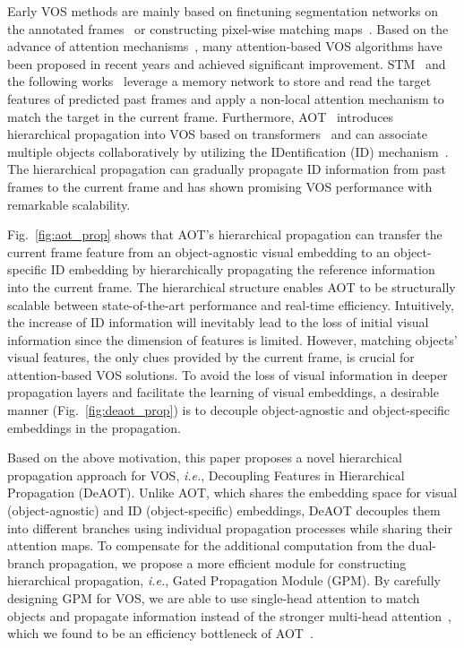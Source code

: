 \documentclass{article}
\def\ie{\emph{i.e.}}
\begin{document}
Early VOS methods are mainly based on finetuning segmentation networks on the annotated frames~\cite{osvos,onavos,premvos} or constructing pixel-wise matching maps~\cite{pml,feelvos}. Based on the advance of attention mechanisms~\cite{att,transformer,nonlocal}, many attention-based VOS algorithms have been proposed in recent years and achieved significant improvement. STM~\cite{spacetime} and the following works~\cite{KMN,cheng2021stcn,hmmn} leverage a memory network to store and read the target features of predicted past frames and apply a non-local attention mechanism to match the target in the current frame. Furthermore, AOT~\cite{aot,aot_workshop,aost} introduces hierarchical propagation into VOS based on transformers~\cite{transformer,detr} and can associate multiple objects collaboratively by utilizing the IDentification (ID) mechanism~\cite{aot}. The hierarchical propagation can gradually propagate ID information from past frames to the current frame and has shown promising VOS performance with remarkable scalability.

Fig.~\ref{fig:aot_prop} shows that AOT's hierarchical propagation can transfer the current frame feature from an object-agnostic visual embedding to an object-specific ID embedding by hierarchically propagating the reference information into the current frame. The hierarchical structure enables AOT to be structurally scalable between state-of-the-art performance and real-time efficiency. Intuitively, the increase of 
ID information will inevitably lead to the loss of initial visual information since the dimension of features is limited. However, matching objects' visual features, the only clues provided by the current frame, is crucial for attention-based VOS solutions. To avoid the loss of visual information in deeper propagation layers and facilitate the learning of visual embeddings, a desirable manner (Fig.~\ref{fig:deaot_prop}) is to decouple object-agnostic and object-specific embeddings in the propagation.

Based on the above motivation, this paper proposes a novel hierarchical propagation approach for VOS, \ie, Decoupling Features in Hierarchical Propagation (DeAOT). Unlike AOT, which shares the embedding space for visual (object-agnostic) and ID (object-specific) embeddings, DeAOT decouples them into different branches using individual propagation processes while sharing their attention maps. To compensate for the additional computation from the dual-branch propagation, we propose a more efficient module for constructing hierarchical propagation, \ie, Gated Propagation Module (GPM). By carefully designing GPM for VOS, we are able to use single-head attention to match objects and propagate information instead of the stronger multi-head attention~\cite{transformer}, which we found to be an efficiency bottleneck of AOT~\cite{aot}.
\end{document}
